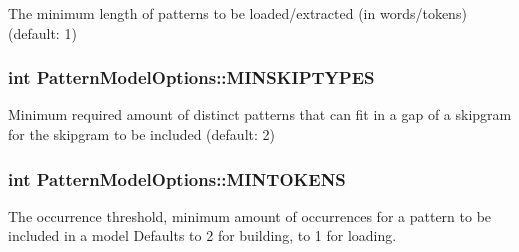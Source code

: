The minimum length of patterns to be loaded/extracted (in words/tokens) (default\+: 1) 

\hypertarget{classPatternModelOptions_ad5b2686b6f641463c54441a595259046}{}
\subsubsection[{M\+I\+N\+S\+K\+I\+P\+T\+Y\+P\+E\+S}]{\setlength{\rightskip}{0pt plus 5cm}int Pattern\+Model\+Options\+::\+M\+I\+N\+S\+K\+I\+P\+T\+Y\+P\+E\+S}\label{classPatternModelOptions_ad5b2686b6f641463c54441a595259046}


Minimum required amount of distinct patterns that can fit in a gap of a skipgram for the skipgram to be included (default\+: 2) 

\hypertarget{classPatternModelOptions_a4572cfbca28c3130d98f886a4c1857e0}{}
\subsubsection[{M\+I\+N\+T\+O\+K\+E\+N\+S}]{\setlength{\rightskip}{0pt plus 5cm}int Pattern\+Model\+Options\+::\+M\+I\+N\+T\+O\+K\+E\+N\+S}\label{classPatternModelOptions_a4572cfbca28c3130d98f886a4c1857e0}
The occurrence threshold, minimum amount of occurrences for a pattern to be included in a model Defaults to 2 for building, to 1 for loading. \hypertarget{classPatternModelOptions_a130b2214a2a9eaaa4862f8019fdfe2bc}{}
